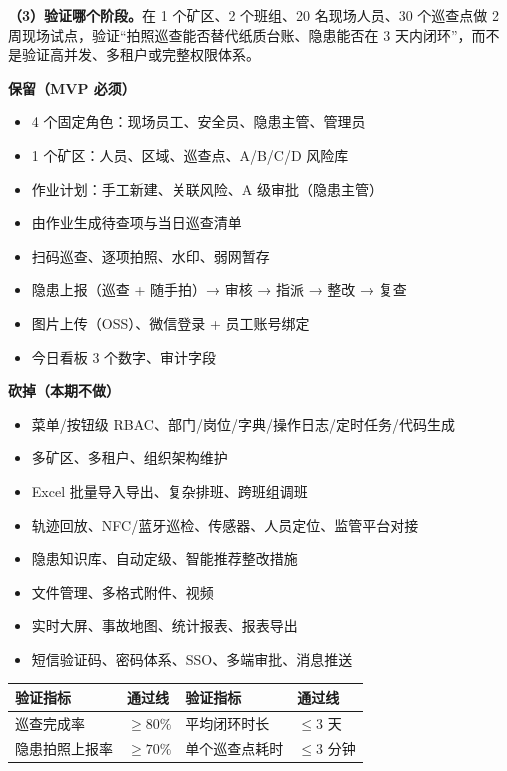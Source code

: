 \documentclass[11pt,a4paper,twoside,fontset=fandol]{ctexart}
\begin{document}
\noindent\textbf{（3）验证哪个阶段。}在 1 个矿区、2 个班组、20 名现场人员、30 个巡查点做 2 周现场试点，验证“拍照巡查能否替代纸质台账、隐患能否在 3 天内闭环”，而不是验证高并发、多租户或完整权限体系。

\vspace{4pt}
\noindent
\begin{minipage}[t]{0.49\linewidth}
\small\textbf{保留（MVP 必须）}
\begin{itemize}[leftmargin=*,nosep,itemsep=1.5pt,topsep=2pt]
  \item 4 个固定角色：现场员工、安全员、隐患主管、管理员
  \item 1 个矿区：人员、区域、巡查点、A/B/C/D 风险库
  \item 作业计划：手工新建、关联风险、A 级审批（隐患主管）
  \item 由作业生成待查项与当日巡查清单
  \item 扫码巡查、逐项拍照、水印、弱网暂存
  \item 隐患上报（巡查 + 随手拍）→ 审核 → 指派 → 整改 → 复查
  \item 图片上传（OSS）、微信登录 + 员工账号绑定
  \item 今日看板 3 个数字、审计字段
\end{itemize}
\end{minipage}\hfill
\begin{minipage}[t]{0.49\linewidth}
\small\textbf{砍掉（本期不做）}
\begin{itemize}[leftmargin=*,nosep,itemsep=1.5pt,topsep=2pt]
  \item 菜单/按钮级 RBAC、部门/岗位/字典/操作日志/定时任务/代码生成
  \item 多矿区、多租户、组织架构维护
  \item Excel 批量导入导出、复杂排班、跨班组调班
  \item 轨迹回放、NFC/蓝牙巡检、传感器、人员定位、监管平台对接
  \item 隐患知识库、自动定级、智能推荐整改措施
  \item 文件管理、多格式附件、视频
  \item 实时大屏、事故地图、统计报表、报表导出
  \item 短信验证码、密码体系、SSO、多端审批、消息推送
\end{itemize}
\end{minipage}

\vspace{6pt}
\begin{table}[H]
\centering
\small
\renewcommand{\arraystretch}{1.25}
\begin{tabularx}{\linewidth}{@{}>{\raggedright\arraybackslash}X>{\centering\arraybackslash}p{20mm}>{\raggedright\arraybackslash}X>{\centering\arraybackslash}p{20mm}@{}}
\toprule
\textbf{验证指标} & \textbf{通过线} & \textbf{验证指标} & \textbf{通过线} \\
\midrule
巡查完成率 & $\ge 80\%$ & 平均闭环时长 & $\le 3$ 天 \\
隐患拍照上报率 & $\ge 70\%$ & 单个巡查点耗时 & $\le 3$ 分钟 \\
\bottomrule
\end{tabularx}
\end{table}
\end{document}

